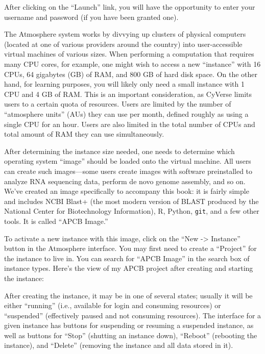 \documentclass[
]{memoir}
\begin{document}
After clicking on the \enquote{Launch} link, you will have the opportunity to enter your username and password (if you have been granted one).

The Atmosphere system works by divvying up clusters of physical computers (located at one of various providers around the country) into user-accessible virtual machines of various sizes. When performing a computation that requires many CPU cores, for example, one might wish to access a new \enquote{instance} with 16 CPUs, 64 gigabytes (GB) of RAM, and 800 GB of hard disk space. On the other hand, for learning purposes, you will likely only need a small instance with 1 CPU and 4 GB of RAM. This is an important consideration, as CyVerse limits users to a certain quota of resources. Users are limited by the number of \enquote{atmosphere units} (AUs) they can use per month, defined roughly as using a single CPU for an hour. Users are also limited in the total number of CPUs and total amount of RAM they can use simultaneously.

After determining the instance size needed, one needs to determine which operating system \enquote{image} should be loaded onto the virtual machine. All users can create such images---some users create images with software preinstalled to analyze RNA sequencing data, perform de novo genome assembly, and so on. We've created an image specifically to accompany this book: it is fairly simple and includes NCBI Blast+ (the most modern version of BLAST produced by the National Center for Biotechnology Information), R, Python, \texttt{git}, and a few other tools. It is called \enquote{APCB Image.}

To activate a new instance with this image, click on the \enquote{New -\textgreater{} Instance} button in the Atmosphere interface. You may first need to create a \enquote{Project} for the instance to live in. You can search for \enquote{APCB Image} in the search box of instance types. Here's the view of my APCB project after creating and starting the instance:

After creating the instance, it may be in one of several states; usually it will be either \enquote{running} (i.e., available for login and consuming resources) or \enquote{suspended} (effectively paused and not consuming resources). The interface for a given instance has buttons for suspending or resuming a suspended instance, as well as buttons for \enquote{Stop} (shutting an instance down), \enquote{Reboot} (rebooting the instance), and \enquote{Delete} (removing the instance and all data stored in it).
\end{document}
